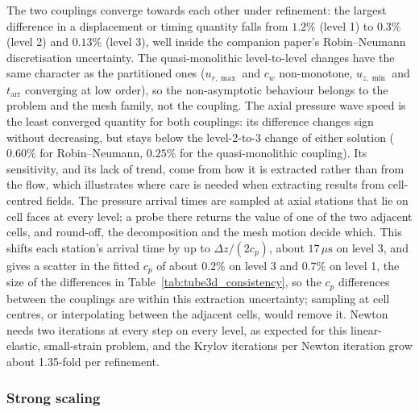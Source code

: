 The two couplings converge towards each other under refinement: the largest difference in a displacement or timing quantity falls from $1.2\%$ (level 1) to $0.3\%$ (level 2) and $0.13\%$ (level 3), well inside the companion paper's Robin--Neumann discretisation uncertainty.
The quasi-monolithic level-to-level changes have the same character as the partitioned ones ($u_{r,\max}$ and $c_w$ non-monotone, $u_{z,\min}$ and $t_\mathrm{arr}$ converging at low order), so the non-asymptotic behaviour belongs to the problem and the mesh family, not the coupling.
The axial pressure wave speed is the least converged quantity for both couplings: its difference changes sign without decreasing, but stays below the level-2-to-3 change of either solution ($0.60\%$ for Robin--Neumann, $0.25\%$ for the quasi-monolithic coupling).
Its sensitivity, and its lack of trend, come from how it is extracted rather than from the flow, which illustrates where care is needed when extracting results from cell-centred fields.
The pressure arrival times are sampled at axial stations that lie on cell faces at every level; a probe there returns the value of one of the two adjacent cells, and round-off, the decomposition and the mesh motion decide which.
This shifts each station's arrival time by up to $\Delta z/(2c_p)$, about $17\,\mu\mathrm{s}$ on level 3, and gives a scatter in the fitted $c_p$ of about $0.2\%$ on level 3 and $0.7\%$ on level 1, the size of the differences in Table~\ref{tab:tube3d_consistency}, so the $c_p$ differences between the couplings are within this extraction uncertainty; sampling at cell centres, or interpolating between the adjacent cells, would remove it.
Newton needs two iterations at every step on every level, as expected for this linear-elastic, small-strain problem, and the Krylov iterations per Newton iteration grow about 1.35-fold per refinement.

\subsubsection{Strong scaling}\label{sec:tube3d_scaling}

